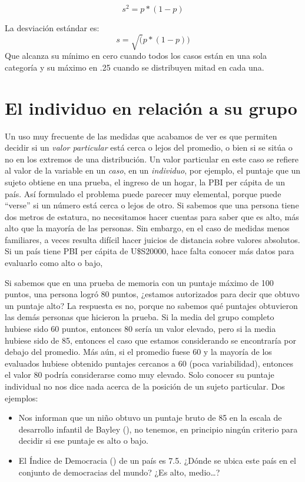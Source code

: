 \documentclass[]{book}
\begin{document}
\[s^2 = p*(1-p)\]

La desviación estándar es: \[s=\sqrt(p*(1-p))\]
Que alcanza su mínimo en cero cuando todos los casos están en una sola categoría y su máximo en .25 cuando se distribuyen mitad en cada una.

\hypertarget{el-individuo-en-relaciuxf3n-a-su-grupo}{%
\section{El individuo en relación a su grupo}\label{el-individuo-en-relaciuxf3n-a-su-grupo}}

Un uso muy frecuente de las medidas que acabamos de ver es que permiten decidir si un \emph{valor particular} está cerca o lejos del promedio, o bien si se sitúa o no en los extremos de una distribución. Un valor particular en este caso se
refiere al valor de la variable en un \emph{caso}, en un \emph{individuo}, por
ejemplo, el puntaje que un sujeto obtiene en una prueba, el ingreso de un hogar, la PBI per cápita de un país. Así formulado
el problema puede parecer muy elemental, porque puede ``verse'' si un
número está cerca o lejos de otro. Si sabemos que una persona tiene dos metros de estatura, no necesitamos hacer cuentas para saber que es alto, más alto que la mayoría de las personas. Sin embargo, en el caso de medidas menos familiares, a veces resulta difícil hacer juicios de distancia sobre valores absolutos. Si un país tiene PBI per cápita de U\$S20000, hace falta conocer más datos para evaluarlo como alto o bajo,

Si sabemos que en una prueba de memoria con un puntaje máximo de 100
puntos, una persona logró 80 puntos, ¿estamos autorizados para decir que obtuvo un puntaje alto? La respuesta es no, porque no sabemos qué
puntajes obtuvieron las demás personas que hicieron la prueba. Si la
media del grupo completo hubiese sido 60 puntos, entonces 80 sería un
valor elevado, pero si la media hubiese sido de 85, entonces el caso que estamos considerando se encontraría por debajo del promedio. Más aún, si el promedio fuese 60 y la mayoría de los evaluados hubiese obtenido puntajes cercanos a 60 (poca variabilidad), entonces el valor 80 podría considerarse como muy elevado. Solo conocer su puntaje individual no nos dice nada acerca de la posición de un sujeto particular. Dos ejemplos:

\begin{itemize}
\item
  Nos informan que un niño obtuvo un puntaje bruto de 85 en
  la escala de desarrollo infantil de Bayley (\citet{Ballot2017}), no tenemos, en principio ningún criterio para decidir si ese puntaje es alto o bajo.
\item
  El Índice de Democracia (\citet{demindex2011}) de un país es 7.5. ¿Dónde se ubica este país en el conjunto de democracias del mundo? ¿Es alto, medio\ldots{}?
\end{itemize}
\end{document}
